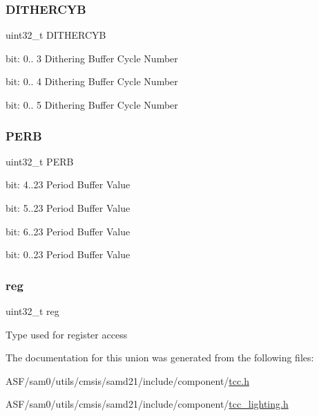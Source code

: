 \subsubsection{\texorpdfstring{DITHERCYB}{DITHERCYB}}
{\footnotesize\ttfamily uint32\+\_\+t D\+I\+T\+H\+E\+R\+C\+YB}

bit\+: 0.. 3 Dithering Buffer Cycle Number

bit\+: 0.. 4 Dithering Buffer Cycle Number

bit\+: 0.. 5 Dithering Buffer Cycle Number \mbox{\label{union_t_c_c___p_e_r_b___type_a097c0f751731b2d8c768978685a6c55f}} 
\subsubsection{\texorpdfstring{PERB}{PERB}}
{\footnotesize\ttfamily uint32\+\_\+t P\+E\+RB}

bit\+: 4..23 Period Buffer Value

bit\+: 5..23 Period Buffer Value

bit\+: 6..23 Period Buffer Value

bit\+: 0..23 Period Buffer Value \mbox{\label{union_t_c_c___p_e_r_b___type_a6b91636401516a477989a336376d7b40}} 
\subsubsection{\texorpdfstring{reg}{reg}}
{\footnotesize\ttfamily uint32\+\_\+t reg}

Type used for register access 

The documentation for this union was generated from the following files\+:\begin{DoxyCompactItemize}
\item 
A\+S\+F/sam0/utils/cmsis/samd21/include/component/\mbox{\hyperlink{tcc_8h}{tcc.\+h}}\item 
A\+S\+F/sam0/utils/cmsis/samd21/include/component/\mbox{\hyperlink{tcc__lighting_8h}{tcc\+\_\+lighting.\+h}}\end{DoxyCompactItemize}

